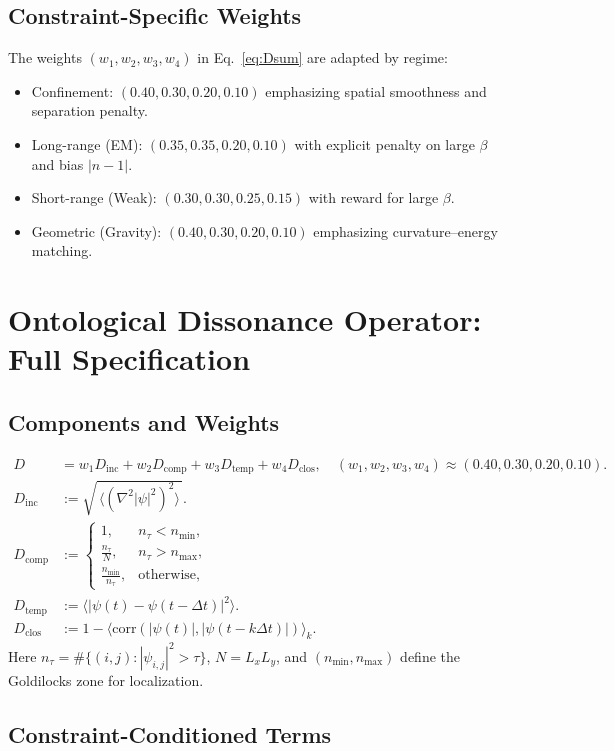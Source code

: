 \documentclass[12pt]{article}
\begin{document}
\subsection{Constraint-Specific Weights}
The weights $(w_1,w_2,w_3,w_4)$ in Eq.~\eqref{eq:Dsum} are adapted by regime:
\begin{itemize}[leftmargin=1.2em]
  \item Confinement: $(0.40,0.30,0.20,0.10)$ emphasizing spatial smoothness and separation penalty.
  \item Long-range (EM): $(0.35,0.35,0.20,0.10)$ with explicit penalty on large $\beta$ and bias $|n-1|$.
  \item Short-range (Weak): $(0.30,0.30,0.25,0.15)$ with reward for large $\beta$.
  \item Geometric (Gravity): $(0.40,0.30,0.20,0.10)$ emphasizing curvature--energy matching.
\end{itemize}

\section{Ontological Dissonance Operator: Full Specification}\label{app:dissonance}
\subsection{Components and Weights}
\begin{align}
D &= w_1 D_{\mathrm{inc}} + w_2 D_{\mathrm{comp}} + w_3 D_{\mathrm{temp}} + w_4 D_{\mathrm{clos}},\quad (w_1,w_2,w_3,w_4)\approx (0.40,0.30,0.20,0.10).\\
D_{\mathrm{inc}} &:= \sqrt{\,\langle (\nabla^2 |\psi|^2)^2\rangle\,}.\\
D_{\mathrm{comp}} &:= \begin{cases}1,& n_{\tau}<n_{\min},\\ \frac{n_{\tau}}{N},& n_{\tau}>n_{\max},\\ \frac{n_{\min}}{n_{\tau}},& \text{otherwise},\end{cases}\\
D_{\mathrm{temp}} &:= \langle |\psi(t)-\psi(t-\Delta t)|^2\rangle.\\
D_{\mathrm{clos}} &:= 1-\langle \mathrm{corr}(|\psi(t)|,|\psi(t-k\Delta t)|)\rangle_{k}.
\end{align}
Here $n_{\tau}=\#\{(i,j):|\psi_{i,j}|^2>\tau\}$, $N=L_xL_y$, and $(n_{\min},n_{\max})$ define the Goldilocks zone for localization.

\subsection{Constraint-Conditioned Terms}
\end{document}
